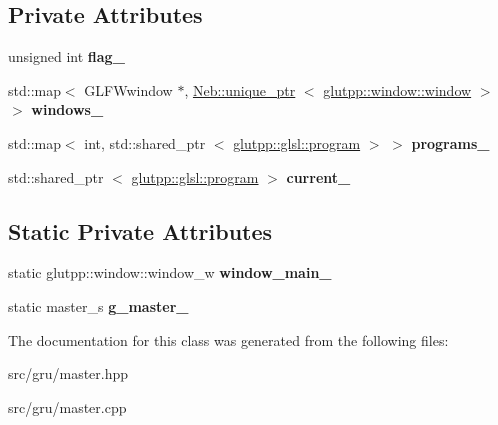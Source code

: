 \subsection*{\-Private \-Attributes}
\begin{DoxyCompactItemize}
\item 
\hypertarget{classglutpp_1_1master_a95bb6d82b55bb9badd6e90b540887edf}{unsigned int {\bfseries flag\-\_\-}}\label{classglutpp_1_1master_a95bb6d82b55bb9badd6e90b540887edf}

\item 
\hypertarget{classglutpp_1_1master_a716b47f5017b0629c093248e855be046}{std\-::map$<$ \-G\-L\-F\-Wwindow \*
$\ast$, \hyperlink{classNeb_1_1unique__ptr}{\-Neb\-::unique\-\_\-ptr}\*
$<$ \hyperlink{classglutpp_1_1window_1_1window}{glutpp\-::window\-::window} $>$ $>$ {\bfseries windows\-\_\-}}\label{classglutpp_1_1master_a716b47f5017b0629c093248e855be046}

\item 
\hypertarget{classglutpp_1_1master_ad74d09a19af8e83e0e350555036e6983}{std\-::map$<$ int, std\-::shared\-\_\-ptr\*
$<$ \hyperlink{classglutpp_1_1glsl_1_1program}{glutpp\-::glsl\-::program} $>$ $>$ {\bfseries programs\-\_\-}}\label{classglutpp_1_1master_ad74d09a19af8e83e0e350555036e6983}

\item 
\hypertarget{classglutpp_1_1master_a4a64b4b1fc3347a2523b28b70c49ef62}{std\-::shared\-\_\-ptr\*
$<$ \hyperlink{classglutpp_1_1glsl_1_1program}{glutpp\-::glsl\-::program} $>$ {\bfseries current\-\_\-}}\label{classglutpp_1_1master_a4a64b4b1fc3347a2523b28b70c49ef62}

\end{DoxyCompactItemize}
\subsection*{\-Static \-Private \-Attributes}
\begin{DoxyCompactItemize}
\item 
\hypertarget{classglutpp_1_1master_ab43b29dfb8f37694c89f08411a68f267}{static glutpp\-::window\-::window\-\_\-w {\bfseries window\-\_\-main\-\_\-}}\label{classglutpp_1_1master_ab43b29dfb8f37694c89f08411a68f267}

\item 
\hypertarget{classglutpp_1_1master_a0151ff558558393aa9aff680a66f0c31}{static master\-\_\-s {\bfseries g\-\_\-master\-\_\-}}\label{classglutpp_1_1master_a0151ff558558393aa9aff680a66f0c31}

\end{DoxyCompactItemize}


\-The documentation for this class was generated from the following files\-:\begin{DoxyCompactItemize}
\item 
src/gru/master.\-hpp\item 
src/gru/master.\-cpp\end{DoxyCompactItemize}
